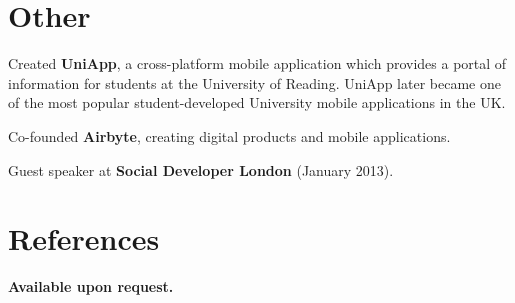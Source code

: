 \documentclass[margin,line,a4paper]{resume}
\begin{document}
\begin{resume}
	

    	\section{\mysidestyle Other}

	\begin{list2}
		\item Created \textbf{UniApp}, a cross-platform mobile application which provides a portal of information for students at the University of Reading. UniApp later became one of the most popular student-developed University mobile applications in the UK.
		\item Co-founded \textbf{Airbyte}, creating digital products and mobile applications.
		\item Guest speaker at \textbf{Social Developer London} (January 2013).
	\end{list2}

 	

	\section{\mysidestyle References}
	
	\textbf{Available upon request.}\vspace{1mm}\\%

\end{resume}
\end{document}
